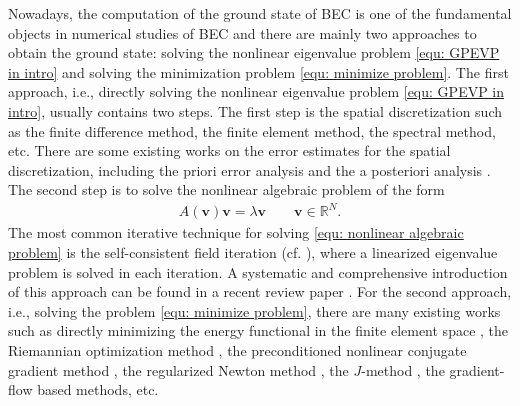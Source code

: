 \documentclass{siamart250211}
\def\R{\mathbb{R}}
\begin{document}
Nowadays, the computation of the ground state of BEC is one of the fundamental objects in numerical studies of BEC and there are mainly two approaches to obtain the ground state: solving the nonlinear eigenvalue problem \eqref{equ: GPEVP in intro} and solving the minimization problem \eqref{equ: minimize problem}. The first approach, i.e., directly solving the nonlinear eigenvalue problem \eqref{equ: GPEVP in intro}, usually contains two steps. The first step is the spatial discretization such as the finite difference method, the finite element method, the spectral method, etc. There are some existing works on the error estimates for the spatial discretization, including the priori error analysis \cite{cances2010numerical,chen20111846,henning2025discrete,zhou2003analysis} and the a posteriori analysis \cite{chen20111846,dusson2017posteriori}. The second step is to solve the nonlinear algebraic problem of the form 
\begin{align}\label{equ: nonlinear algebraic problem}
    A(\mathbf{v})\mathbf{v} = \lambda \mathbf{v} \qquad \mathbf{v} \in \R^{N}.
\end{align}
The most common iterative technique for solving \eqref{equ: nonlinear algebraic problem} is the self-consistent field iteration (cf. \cite{ cances2000SCF, cances2021convergence, cances2000on,dion2007ground, upadhyaya2021density}), where a linearized eigenvalue problem is solved in each iteration. A systematic and comprehensive introduction of this approach can be found in a recent review paper \cite[Sections 3 and 4]{henning2025gross}. For the second approach, i.e., solving the problem \eqref{equ: minimize problem}, there are many existing works such as directly minimizing the energy functional in the finite element space \cite{bao2003ground}, the Riemannian optimization method \cite{altmann2022energy, altmann2024riemanniannewton, danaila2017computation}, the preconditioned nonlinear conjugate gradient method \cite{antoine2017efficient}, the regularized Newton method \cite{wu2017regularized}, the $J$-method \cite{altmann2021j, jarlebring2014inverse}, the gradient-flow based methods,  etc. 
\end{document}
